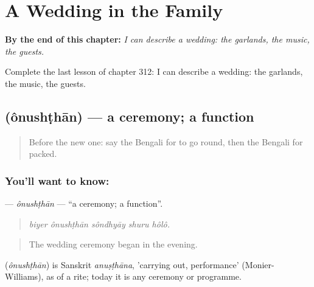 
\chapter{A Wedding in the Family}
\label{ch:bn-a-wedding-in-the-family}

\begin{chapteropening}
\textbf{By the end of this chapter:} \emph{I can describe a wedding: the garlands, the music, the guests.}

Complete the last lesson of chapter 312: I can describe a wedding: the garlands, the music, the guests.
\end{chapteropening}

\section[\texorpdfstring{\bn{অনুষ্ঠান} (ônushṭhān)}{অনুষ্ঠান (ônushṭhān)}]{ (ônushṭhān) — a ceremony; a function}

\label{lesson:BN-C312-onushthan}



\begin{quote}
Before the new one: say the Bengali for to go round, then the Bengali for packed.
\end{quote}

\subsection*{You'll want to know: }
\textbf{} — \emph{ônushṭhān} — \textquotedblleft{}a ceremony; a function\textquotedblright{}.

\begin{quote}
    
\end{quote}

\begin{quote}
\emph{biyer ônushṭhān sôndhyāy shuru hôlô.}
\end{quote}

\begin{quote}
The wedding ceremony began in the evening.
\end{quote}

\begin{cousinweb}
\textbf{} (\emph{ônushṭhān}) is Sanskrit \emph{anuṣṭhāna}, 'carrying out, performance' (Monier-Williams), as of a rite; today it is any ceremony or programme.
\end{cousinweb}

